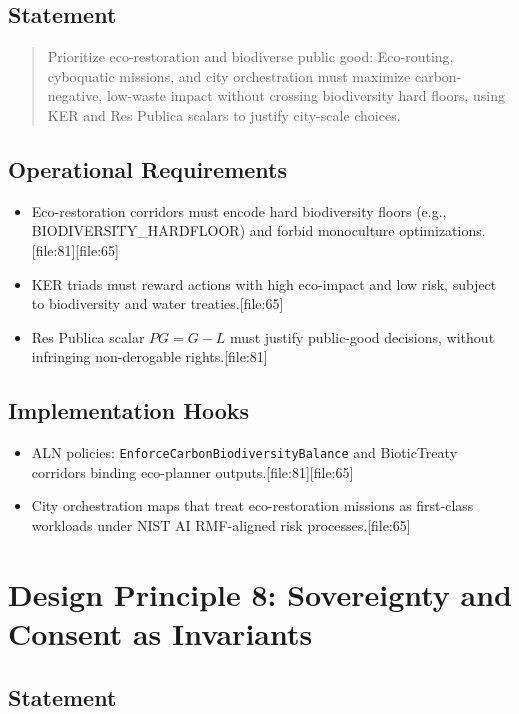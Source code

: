 \documentclass[11pt]{article}
\begin{document}
\subsection{Statement}

\begin{quote}
Prioritize eco-restoration and biodiverse public good: Eco-routing, cyboquatic missions, and city orchestration must maximize carbon-negative, low-waste impact without crossing biodiversity hard floors, using KER and Res Publica scalars to justify city-scale choices.
\end{quote}

\subsection{Operational Requirements}

\begin{itemize}[nosep]
  \item Eco-restoration corridors must encode hard biodiversity floors (e.g., BIODIVERSITY\_HARDFLOOR) and forbid monoculture optimizations.[file:81][file:65]
  \item KER triads must reward actions with high eco-impact and low risk, subject to biodiversity and water treaties.[file:65]
  \item Res Publica scalar \( PG = G - L \) must justify public-good decisions, without infringing non-derogable rights.[file:81]
\end{itemize}

\subsection{Implementation Hooks}

\begin{itemize}[nosep]
  \item ALN policies: \texttt{EnforceCarbonBiodiversityBalance} and BioticTreaty corridors binding eco-planner outputs.[file:81][file:65]
  \item City orchestration maps that treat eco-restoration missions as first-class workloads under NIST AI RMF-aligned risk processes.[file:65]
\end{itemize}

\section{Design Principle 8: Sovereignty and Consent as Invariants}

\subsection{Statement}
\end{document}
